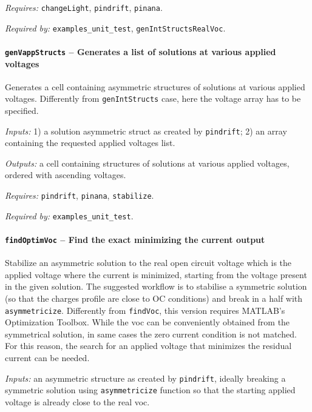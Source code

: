 		\textit{Requires:} \texttt{change\-Light}, \texttt{pin\-drift}, \texttt{pinana}.

		\textit{Required by:} \texttt{examples\_unit\_test}, \texttt{gen\-Int\-Structs\-Real\-Voc}.

		\paragraph{\texttt{gen\-Vapp\-Structs} -- Generates a list of solutions at various applied voltages}\label{genVappStructs}
		Generates a cell containing asymmetric structures of solutions at various applied voltages.
		Differently from \texttt{gen\-Int\-Structs} case, here the voltage array has to be specified.

		\textit{Inputs:} 1) a solution asymmetric struct as created by \texttt{pin\-drift};
		2) an array containing the requested applied voltages list.

		\textit{Outputs:} a cell containing structures of solutions at various applied
		voltages, ordered with ascending voltages.

		\textit{Requires:} \texttt{pin\-drift}, \texttt{pinana}, \texttt{stabilize}.

		\textit{Required by:} \texttt{examples\_unit\_test}.

		\paragraph{\texttt{find\-Optim\-Voc} -- Find the exact  minimizing the current output}
		Stabilize an asymmetric solution to the real open circuit voltage
		which is the applied voltage where the current is minimized,
		starting from the voltage present in the given solution. The suggested
		workflow is to stabilise a symmetric solution (so that the charges
		profile are close to OC conditions) and break in a half with
		\texttt{asymmetricize}.
		Differently from \texttt{find\-Voc}, this version requires MATLAB's Optimization Toolbox.
		While the \gls{voc} can be conveniently obtained from the symmetrical solution, in same cases the zero current condition is not matched.
		For this reason, the search for an applied voltage that minimizes the residual current can be needed.

		\textit{Inputs:} an asymmetric structure as created by \texttt{pin\-drift}, ideally
		breaking a symmetric solution using \texttt{asymmetricize} function so that
		the starting applied voltage is already close to the real \gls{voc}.

